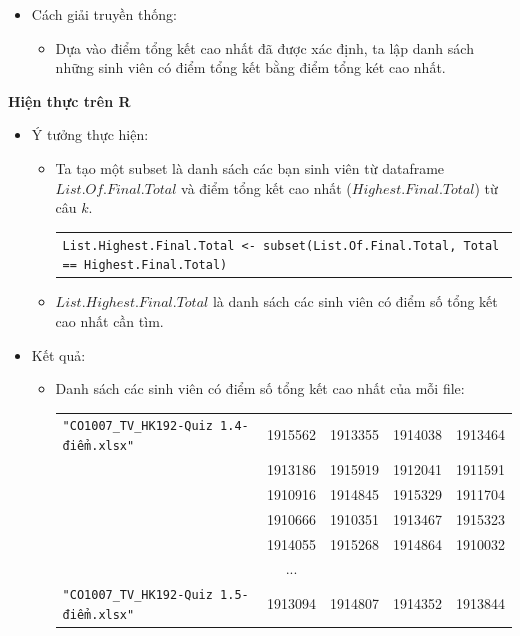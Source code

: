 \documentclass[a4paper]{article}
\theoremstyle{definition}
\begin{document}
\begin{enumerate}[a)]
    \begin{itemize}
        \item Cách giải truyền thống:
        \begin{itemize}
            \item Dựa vào điểm tổng kết cao nhất đã được xác định, ta lập danh sách những sinh viên có điểm tổng kết bằng điểm tổng két cao nhất.
        \end{itemize}
    \end{itemize}
    \bf Hiện thực trên R\normalfont
    \begin{itemize}
        \item Ý tưởng thực hiện:
        \begin{itemize}
            \item Ta tạo một subset là danh sách các bạn sinh viên từ dataframe $List.Of.Final.Total$ và điểm tổng kết cao nhất ($Highest.Final.Total$) từ câu $k$.
            \begin{center}
                \begin{tabular}{p{13cm}}
                    \texttt{List.Highest.Final.Total <- subset(List.Of.Final.Total, Total == Highest.Final.Total)}
                \end{tabular}
            \end{center}
            \item $List.Highest.Final.Total$ là danh sách các sinh viên có điểm số tổng kết cao nhất cần tìm.
        \end{itemize}
        \item Kết quả:
        \begin{itemize}
            \item Danh sách các sinh viên có điểm số tổng kết cao nhất của mỗi file:
            \begin{center}
                \begin{tabular}{l c c c c}
                     \texttt{"CO1007\_TV\_HK192-Quiz 1.4-điểm.xlsx"} & 1915562 & 1913355 & 1914038 & 1913464\\
                     & 1913186 & 1915919 & 1912041 & 1911591\\
                     & 1910916 & 1914845 & 1915329 & 1911704\\
                     & 1910666 & 1910351 & 1913467 & 1915323\\
                     & 1914055 & 1915268 & 1914864 & 1910032\\
                     & ...\\
                     \texttt{"CO1007\_TV\_HK192-Quiz 1.5-điểm.xlsx"} & 1913094 & 1914807 & 1914352 & 1913844 \\

\end{tabular}
\end{center}
\end{itemize}
\end{itemize}
\end{enumerate}
\end{document}
